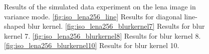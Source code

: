 \documentclass[12pt,notitlepage]{report}
\begin{document}
\clearpage

\begin{figure}[htb]
  \centering

  \caption[Results for the lena image in variance mode]{Results of the simulated data experiment on the lena image in variance mode. \ref{fig:iso_lena256_line} Results for diagonal line-shaped blur kernel. \ref{fig:iso_lena256_blurkernel7} Results for blur kernel 7. \ref{fig:iso_lena256_blurkernel8} Results for blur kernel 8. \ref{fig:iso_lena256_blurkernel10} Results for blur kernel 10.}
  \label{fig:var_lena256}
\end{figure}
\end{document}
